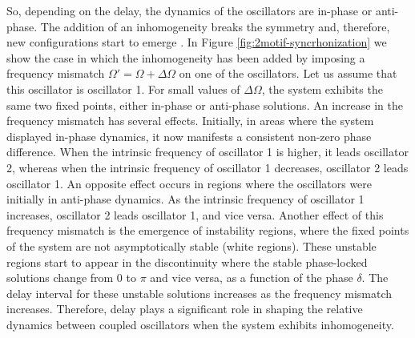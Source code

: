 \documentclass[../main.tex]{subfiles}
\begin{document}
So, depending on the delay, the dynamics of the oscillators are in-phase or anti-phase.
The addition of an inhomogeneity breaks the symmetry and, therefore, new configurations start to emerge \citep{sadeghi_synchronization_2014,esfahani_zero-lag_2014}.
In Figure \ref{fig:2motif-syncrhonization} we show the case in which the inhomogeneity has been added by imposing a frequency mismatch $\Omega' = \Omega +\Delta\Omega$ on one of the oscillators.
Let us assume that this oscillator is oscillator 1.
For small values of $\Delta\Omega$, the system exhibits the same two fixed points, either in-phase or anti-phase solutions.
An increase in the frequency mismatch has several effects. Initially, in areas where the system displayed in-phase dynamics, it now manifests a consistent non-zero phase difference.
When the intrinsic frequency of oscillator 1 is higher, it leads oscillator 2, whereas when the intrinsic frequency of oscillator 1 decreases, oscillator 2 leads oscillator 1.
An opposite effect occurs in regions where the oscillators were initially in anti-phase dynamics.
As the intrinsic frequency of oscillator 1 increases, oscillator 2 leads oscillator 1, and vice versa.
Another effect of this frequency mismatch is the emergence of instability regions, where the fixed points of the system are not asymptotically stable (white regions).
These unstable regions start to appear in the discontinuity where the stable phase-locked solutions change from $0$ to $\pi$ and vice versa, as a function of the phase $\delta$.
The delay interval for these unstable solutions increases as the frequency mismatch increases.
Therefore, delay plays a significant role in shaping the relative dynamics between coupled oscillators when the system exhibits inhomogeneity.
\end{document}
